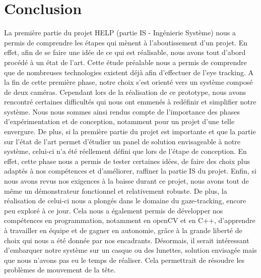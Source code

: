 \section*{Conclusion}

La première partie du projet HELP (partie IS - Ingénierie Système) nous a permis de comprendre les étapes qui mènent à l’aboutissement d’un projet. En effet, afin de se faire une idée de ce qui est réalisable, nous avons tout d’abord procédé à un état de l’art. Cette étude préalable nous a permis de comprendre que de nombreuses technologies existent déjà afin d’effectuer de l’eye tracking. A la fin de cette première phase, notre choix s’est orienté vers un système composé de deux caméras. Cependant lors de la réalisation de ce prototype, nous avons rencontré certaines difficultés qui nous ont emmenés à redéfinir et simplifier notre système. Nous nous sommes ainsi rendus compte de l’importance des phases d’expérimentation et de conception, notamment pour un projet d’une telle envergure. 
\bigbreak
De plus, si la première partie du projet est importante et que la partie sur l’état de l’art permet d’étudier un panel de solution envisageable à notre système, celui-ci n’a été réellement défini que lors de l'étape de conception. En effet, cette phase nous a permis de tester certaines idées, de faire des choix plus adaptés à nos compétences et d’améliorer, raffiner la partie IS du projet.
\bigbreak
Enfin, si nous avons revus nos exigences à la baisse durant ce projet, nous avons tout de même un démonstrateur fonctionnel et relativement robuste. De plus, la réalisation de celui-ci nous a plongés dans le domaine du gaze-tracking, encore peu exploré à ce jour. Cela nous a également permis de développer nos compétences en programmation, notamment en openCV et en C++, d'apprendre à travailler en équipe et de gagner en autonomie, grâce à la grande liberté de choix qui nous a été donnée par nos encadrants. Désormais, il serait intéressant d'embarquer notre système sur un casque ou des lunettes, solution envisagée mais que nous n'avons pas eu le temps de réaliser. Cela permettrait de résoudre les problèmes de mouvement de la tête.
